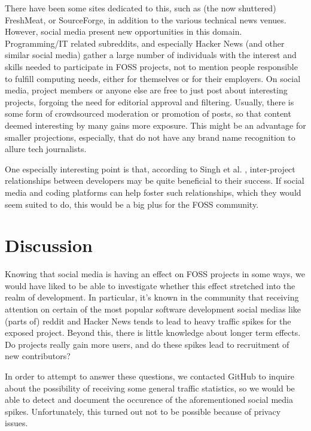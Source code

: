 \documentclass[a4paper,11pt]{article} %
\begin{document}
There have been some sites dedicated to this, such as (the now
shuttered) FreshMeat, or SourceForge, in addition to the various
technical news venues. However, social media present new opportunities
in this domain. Programming/IT related subreddits, and especially
Hacker News (and other similar social media) gather a large number of
individuals with the interest and skills needed to participate in FOSS
projects, not to mention people responsible to fulfill computing
needs, either for themselves or for their employers.  On social media,
project members or anyone else are free to just post about interesting
projects, forgoing the need for editorial approval and
filtering. Usually, there is some form of crowdsourced moderation or
promotion of posts, so that content deemed interesting by many gains
more exposure. This might be an advantage for smaller projections,
especially, that do not have any brand name recognition to allure tech
journalists.

One especially interesting point is that, according to Singh et
al. \cite{singh2011network}, inter-project relationships between
developers may be quite beneficial to their success. If social media
and coding platforms can help foster such relationships, which they
would seem suited to do, this would be a big plus for the FOSS
community.

\section{Discussion}

Knowing that social media is having an effect on FOSS projects in some
ways, we would have liked to be able to investigate whether this
effect stretched into the realm of development. In particular, it's
known in the community that receiving attention on certain of the most
popular software development social medias like (parts of) reddit and
Hacker News tends to lead to heavy traffic spikes for the exposed
project. Beyond this, there is little knowledge about longer term
effects. Do projects really gain more users, and do these spikes lead
to recruitment of new contributors?

In order to attempt to answer these questions, we contacted GitHub to
inquire about the possibility of receiving some general traffic
statistics, so we would be able to detect and document the occurence
of the aforementioned social media spikes. Unfortunately, this turned
out not to be possible because of privacy issues.
\end{document}
